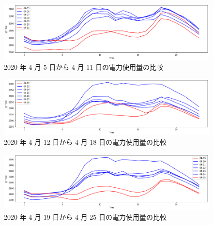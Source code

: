 
\begin{figure}[hb]
\centering
\includegraphics[scale=0.5]{2020_week1.png}
 \caption{2020 年 4 月 5 日から 4 月 11 日の電力使用量の比較}
\end{figure}
\begin{figure}[hb]
\centering
\includegraphics[scale=0.5]{2020_week2.png}
 \caption{2020 年 4 月 12 日から 4 月 18 日の電力使用量の比較}
\end{figure}
\begin{figure}[hb]
\centering
\includegraphics[scale=0.5]{2020_week3.png}
 \caption{2020 年 4 月 19 日から 4 月 25 日の電力使用量の比較}
\end{figure}

